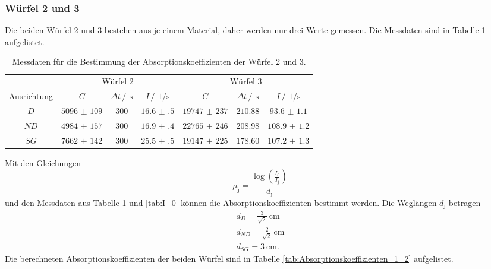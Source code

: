 \subsubsection{Würfel 2 und 3}
Die beiden Würfel 2 und 3 bestehen aus je einem Material, daher werden nur drei Werte gemessen.
Die Messdaten sind in Tabelle \ref{tab:Würfel_1_2} aufgelistet.
\FloatBarrier
\begin{table}
    \centering
    \caption{Messdaten für die Bestimmung der Absorptionskoeffizienten der Würfel 2 und 3.}
    \label{tab:Würfel_1_2}
    \begin{tabular}{c c c c c c c}
        \toprule
        &\multicolumn{3}{c}{Würfel 2}&\multicolumn{3}{c}{Würfel 3}\\
        \cmidrule(lr){2-4}\cmidrule(lr){5-7}
        Ausrichtung&$C$&$\Delta t \,/\,\SI{}{\second}$&$I \,/\,\SI{}{1\per\second}$&$C$&$\Delta t \,/\,\SI{}{\second}$&$I \,/\,\SI{}{1\per\second}$\\
        \midrule
        $D$ &$\num{5096(109)}$&$\num{300}$&$\num{16.6(5)}$&$\num{19747(237)}$&$\num{210.88}$&$\num{93.6(11)}$\\
        $ND$&$\num{4984(157)}$&$\num{300}$&$\num{16.9(4)}$&$\num{22765(246)}$&$\num{208.98}$&$\num{108.9(12)}$\\
        $SG$&$\num{7662(142)}$&$\num{300}$&$\num{25.5(5)}$&$\num{19147(225)}$&$\num{178.60}$&$\num{107.2(13)}$\\
        \bottomrule
    \end{tabular}
\end{table}
\FloatBarrier
Mit den Gleichungen
\begin{equation*}
    \mu_{\text{j}}= \frac{\log{\left(\frac{I_0}{I_\text{j}}\right)}}{d_{\text{j}}}
\end{equation*} 
und den Messdaten aus Tabelle \ref{tab:Würfel_1_2} und \ref{tab:I_0} können die Absorptionskoeffizienten bestimmt werden. 
Die Weglängen $d_{\text{j}}$ betragen
\begin{gather*}
    d_{D} =\frac{3}{\sqrt{2}}\SI{}{\centi\meter}\\
    d_{ND}=\frac{2}{\sqrt{2}}\SI{}{\centi\meter}\\
    d_{SG}=\SI{3}{\centi\meter}.
\end{gather*}
Die berechneten Absorptionskoeffizienten der beiden Würfel sind in Tabelle \ref{tab:Absorptionskoeffizienten_1_2} aufgelistet.
\FloatBarrier
